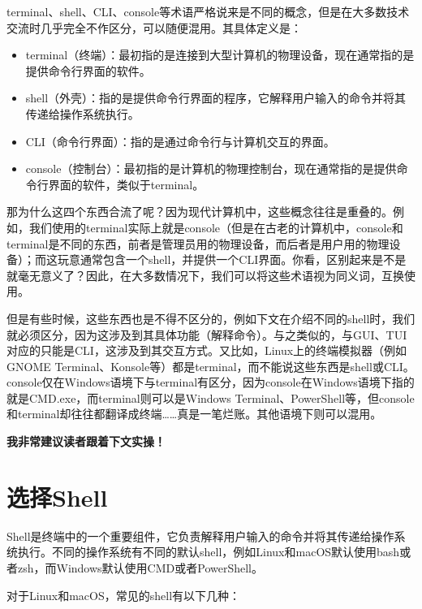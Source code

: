 \begin{tip}
    terminal、shell、CLI、console等术语严格说来是不同的概念，但是在大多数技术交流时几乎完全不作区分，可以随便混用。其具体定义是：
    \begin{itemize}
        \item terminal（终端）：最初指的是连接到大型计算机的物理设备，现在通常指的是提供命令行界面的软件。
        \item shell（外壳）：指的是提供命令行界面的程序，它解释用户输入的命令并将其传递给操作系统执行。
        \item CLI（命令行界面）：指的是通过命令行与计算机交互的界面。
        \item console（控制台）：最初指的是计算机的物理控制台，现在通常指的是提供命令行界面的软件，类似于terminal。
    \end{itemize}
    那为什么这四个东西合流了呢？因为现代计算机中，这些概念往往是重叠的。例如，我们使用的terminal实际上就是console（但是在古老的计算机中，console和terminal是不同的东西，前者是管理员用的物理设备，而后者是用户用的物理设备）；而这玩意通常包含一个shell，并提供一个CLI界面。你看，区别起来是不是就毫无意义了？因此，在大多数情况下，我们可以将这些术语视为同义词，互换使用。

    但是有些时候，这些东西也是不得不区分的，例如下文在介绍不同的shell时，我们就必须区分，因为这涉及到其具体功能（解释命令）。与之类似的，与GUI、TUI对应的只能是CLI，这涉及到其交互方式。又比如，Linux上的终端模拟器（例如GNOME Terminal、Konsole等）都是terminal，而不能说这些东西是shell或CLI。console仅在Windows语境下与terminal有区分，因为console在Windows语境下指的就是CMD.exe，而terminal则可以是Windows Terminal、PowerShell等，但console和terminal却往往都翻译成终端……真是一笔烂账。其他语境下则可以混用。
\end{tip}

\textbf{\color{red} 我非常建议读者跟着下文实操！}

\section{选择Shell}

Shell是终端中的一个重要组件，它负责解释用户输入的命令并将其传递给操作系统执行。不同的操作系统有不同的默认shell，例如Linux和macOS默认使用bash或者zsh，而Windows默认使用CMD或者PowerShell。

对于Linux和macOS，常见的shell有以下几种：

